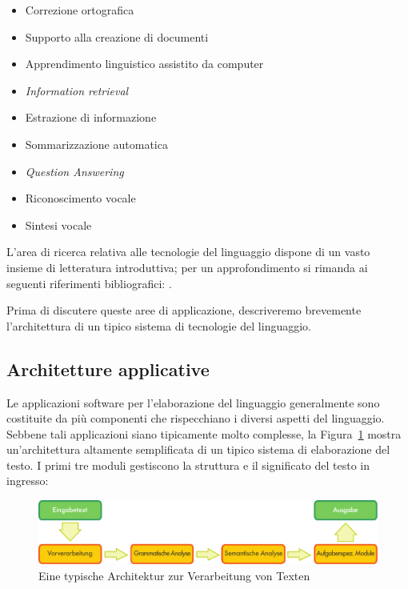 \documentclass[]{../../metanetpaper}
\begin{document}
\begin{multicols}{2}
\begin{itemize}
\item Correzione ortografica
\item Supporto alla creazione di documenti
\item Apprendimento linguistico assistito da computer
\item \emph{Information retrieval}
\item Estrazione di informazione
\item Sommarizzazione automatica
\item \emph{Question Answering}
\item Riconoscimento vocale 
\item Sintesi vocale
\end{itemize}


L'area di ricerca relativa alle tecnologie del linguaggio dispone
di un vasto insieme di letteratura introduttiva; per un approfondimento 
si rimanda ai seguenti riferimenti bibliografici:  
\cite{carstensen-etal1, jurafsky-martin01, manning-schuetze1,  lt-world1, lt-survey1}.

Prima di discutere queste aree di applicazione, descriveremo brevemente
l'architettura di un tipico sistema di tecnologie del linguaggio.




\subsection{Architetture applicative}

Le applicazioni software per l'elaborazione del linguaggio generalmente sono
costituite da pi\`{u} componenti che rispecchiano i diversi aspetti del
linguaggio. Sebbene tali applicazioni siano tipicamente molto complesse, la 
Figura~\ref{fig:textprocessingarch_de} mostra un'architettura altamente 
semplificata di un tipico sistema di elaborazione del testo. I primi tre
moduli gestiscono la struttura e il significato del testo in ingresso:


\begin{figure}[htb]
  \center
  \includegraphics[width=\textwidth]{../_media/german/text_processing_app_architecture}
  \caption{Eine typische Architektur zur Verarbeitung von Texten}
  \label{fig:textprocessingarch_de}
\end{figure}




\end{multicols}
\end{document}
